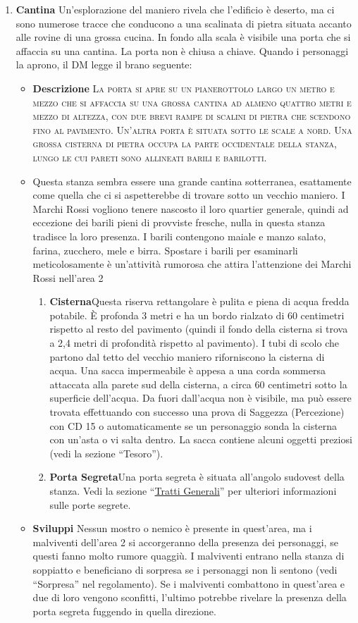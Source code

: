 \documentclass{article}
\begin{document}
\begin{enumerate}
    \item \textbf{Cantina} Un’esplorazione del maniero rivela che l’edificio è deserto,
ma ci sono numerose tracce che conducono a una scalinata
di pietra situata accanto alle rovine di una grossa cucina. In
fondo alla scala è visibile una porta che si affaccia su una
cantina. La porta non è chiusa a chiave.
Quando i personaggi la aprono, il DM legge il brano seguente:
        \begin{itemize}
            \item \textbf{Descrizione} \textsc{La porta si apre su un pianerottolo largo un metro e mezzo che si
affaccia su una grossa cantina ad almeno quattro metri e mezzo
di altezza, con due brevi rampe di scalini di pietra che scendono
fino al pavimento. Un'altra porta è situata sotto le scale a nord.
Una grossa cisterna di pietra occupa la parte occidentale della
stanza, lungo le cui pareti sono allineati barili e barilotti.}
            \item Questa stanza sembra essere una grande cantina
sotterranea, esattamente come quella che ci si aspetterebbe
di trovare sotto un vecchio maniero. I Marchi Rossi vogliono
tenere nascosto il loro quartier generale, quindi ad eccezione
dei barili pieni di provviste fresche, nulla in questa stanza
tradisce la loro presenza.
I barili contengono maiale e manzo salato, farina,
zucchero, mele e birra. Spostare i barili per esaminarli
meticolosamente è un'attività rumorosa che attira l’attenzione
dei Marchi Rossi nell’area 2
\begin{enumerate}
    \item \textbf{Cisterna}Questa riserva rettangolare è pulita e piena di
acqua fredda potabile. È profonda 3 metri e ha un bordo
rialzato di 60 centimetri rispetto al resto del pavimento
(quindi il fondo della cisterna si trova a 2,4 metri di profondità
rispetto al pavimento). I tubi di scolo che partono dal tetto del
vecchio maniero riforniscono la cisterna di acqua.
Una sacca impermeabile è appesa a una corda sommersa
attaccata alla parete sud della cisterna, a circa 60 centimetri
sotto la superficie dell’acqua. Da fuori dall'acqua non è
visibile, ma può essere trovata effettuando con successo una
prova di Saggezza (Percezione) con CD 15 o automaticamente
se un personaggio sonda la cisterna con un'asta o vi salta
dentro. La sacca contiene alcuni oggetti preziosi (vedi la
sezione “Tesoro”).
\item \textbf{Porta Segreta}Una porta segreta è situata all'angolo
sudovest della stanza. Vedi la sezione “\hyperlink{trattigen}{Tratti Generali}” per
ulteriori informazioni sulle porte segrete.
\end{enumerate}
\item \textbf{Sviluppi} Nessun mostro o nemico è presente in quest'area, ma
i malviventi dell’area 2 si accorgeranno della presenza
dei personaggi, se questi fanno molto rumore quaggiù. I
malviventi entrano nella stanza di soppiatto e beneficiano
di sorpresa se i personaggi non li sentono (vedi “Sorpresa”
nel regolamento). Se i malviventi combattono in quest'area
e due di loro vengono sconfitti, l’ultimo potrebbe rivelare la
presenza della porta segreta fuggendo in quella direzione.


\end{itemize}
\end{enumerate}
\end{document}
